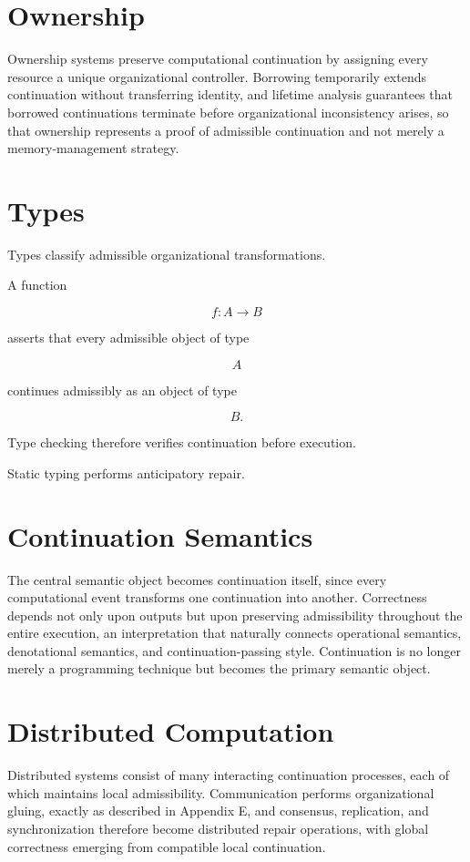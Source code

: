 \documentclass[11pt,oneside]{book}
\numberwithin{equation}{chapter}
\theoremstyle{definition}
\theoremstyle{plain}
\begin{document}
\section{Ownership}

Ownership systems preserve computational continuation by assigning every resource a unique organizational controller. Borrowing temporarily extends continuation without transferring identity, and lifetime analysis guarantees that borrowed continuations terminate before organizational inconsistency arises, so that ownership represents a proof of admissible continuation and not merely a memory-management strategy.

\section{Types}

Types classify admissible organizational transformations.

A function

\[
f
:
A
\rightarrow
B
\]

asserts that every admissible object of type

\[
A
\]

continues admissibly as an object of type

\[
B.
\]

Type checking therefore verifies continuation before execution.

Static typing performs anticipatory repair.

\section{Continuation Semantics}

The central semantic object becomes continuation itself, since every computational event transforms one continuation into another. Correctness depends not only upon outputs but upon preserving admissibility throughout the entire execution, an interpretation that naturally connects operational semantics, denotational semantics, and continuation-passing style. Continuation is no longer merely a programming technique but becomes the primary semantic object.

\section{Distributed Computation}

Distributed systems consist of many interacting continuation processes, each of which maintains local admissibility. Communication performs organizational gluing, exactly as described in Appendix E, and consensus, replication, and synchronization therefore become distributed repair operations, with global correctness emerging from compatible local continuation.
\end{document}
